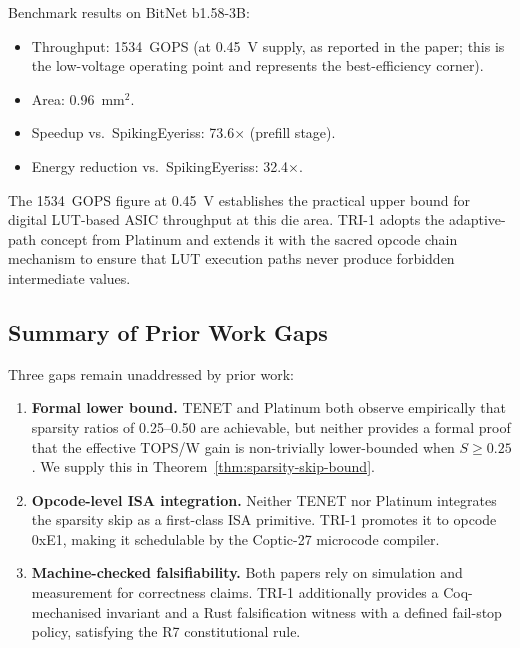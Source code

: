 Benchmark results on BitNet b1.58-3B:

\begin{itemize}
  \item Throughput: 1534~GOPS (at 0.45~V supply, as reported in the
        paper; this is the low-voltage operating point and represents
        the best-efficiency corner).
  \item Area: 0.96~mm$^2$.
  \item Speedup vs.\ SpikingEyeriss: 73.6$\times$ (prefill stage).
  \item Energy reduction vs.\ SpikingEyeriss: 32.4$\times$.
\end{itemize}

The 1534~GOPS figure at 0.45~V establishes the practical upper bound
for digital LUT-based ASIC throughput at this die area.
TRI-1 adopts the adaptive-path concept from Platinum and extends it
with the sacred opcode chain mechanism to ensure that LUT execution
paths never produce forbidden intermediate values.

\subsection{Summary of Prior Work Gaps}
\label{subsec:ch79-prior-gaps}

Three gaps remain unaddressed by prior work:

\begin{enumerate}
  \item \textbf{Formal lower bound.}
        TENET and Platinum both observe empirically that sparsity ratios
        of 0.25--0.50 are achievable, but neither provides a formal proof
        that the effective TOPS/W gain is non-trivially lower-bounded
        when $S \geq 0.25$.  We supply this in Theorem~\ref{thm:sparsity-skip-bound}.

  \item \textbf{Opcode-level ISA integration.}
        Neither TENET nor Platinum integrates the sparsity skip as a
        first-class ISA primitive.  TRI-1 promotes it to opcode 0xE1,
        making it schedulable by the Coptic-27 microcode compiler.

  \item \textbf{Machine-checked falsifiability.}
        Both papers rely on simulation and measurement for correctness
        claims.  TRI-1 additionally provides a Coq-mechanised invariant
        and a Rust falsification witness with a defined fail-stop policy,
        satisfying the R7 constitutional rule.
\end{enumerate}

